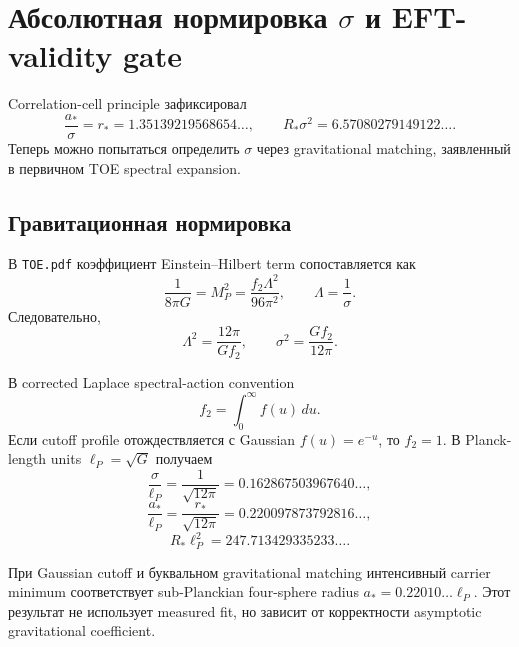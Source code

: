 \chapter{Абсолютная нормировка \texorpdfstring{\(\sigma\)}{sigma} и EFT-validity gate}

Correlation-cell principle зафиксировал
\begin{equation}
 \frac{a_*}{\sigma}=r_*=1.35139219568654\ldots,
 \qquad
 R_*\sigma^2=6.57080279149122\ldots.
\end{equation}
Теперь можно попытаться определить \(\sigma\) через gravitational matching,
заявленный в первичном TOE spectral expansion.

\section{Гравитационная нормировка}

В \texttt{TOE.pdf} коэффициент Einstein--Hilbert term сопоставляется как
\begin{equation}
 \frac1{8\pi G}=M_P^2
 =\frac{f_2\Lambda^2}{96\pi^2},
 \qquad
 \Lambda=\frac1\sigma.
 \label{eq:toe-gravitational-matching}
\end{equation}
Следовательно,
\begin{equation}
 \Lambda^2=\frac{12\pi}{Gf_2},
 \qquad
 \sigma^2=\frac{Gf_2}{12\pi}.
 \label{eq:toe-sigma-from-gravity}
\end{equation}

В corrected Laplace spectral-action convention
\begin{equation}
 f_2=\int_0^\infty f(u)\,du.
\end{equation}
Если cutoff profile отождествляется с Gaussian
\(f(u)=e^{-u}\), то \(f_2=1\). В Planck-length units
\(\ell_P=\sqrt G\) получаем
\begin{equation}
 \frac{\sigma}{\ell_P}
 =\frac1{\sqrt{12\pi}}
 =0.162867503967640\ldots,
\end{equation}
\begin{equation}
 \frac{a_*}{\ell_P}
 =\frac{r_*}{\sqrt{12\pi}}
 =0.220097873792816\ldots,
\end{equation}
\begin{equation}
 R_*\ell_P^2
 =247.713429335233\ldots.
\end{equation}

\begin{proposition}
При Gaussian cutoff и буквальном gravitational matching интенсивный carrier
minimum соответствует sub-Planckian four-sphere radius
\(a_*=0.22010\ldots\ell_P\). Этот результат не использует measured fit,
но зависит от корректности asymptotic gravitational coefficient.
\end{proposition}

